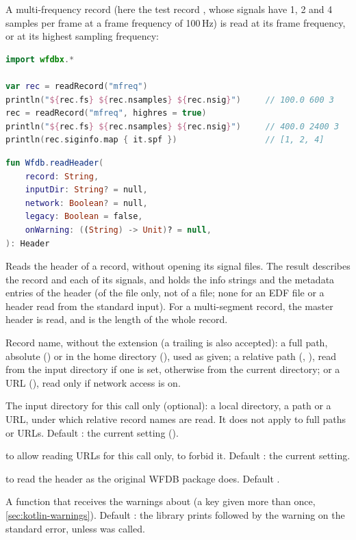 A multi-frequency record (here the test record , whose signals have 1, 2
and 4 samples per frame at a frame frequency of 100\,Hz) is read at its frame frequency,
or at its highest sampling frequency:
\begin{lstlisting}[language=Kotlin,style=example]
import wfdbx.*

var rec = readRecord("mfreq")
println("${rec.fs} ${rec.nsamples} ${rec.nsig}")     // 100.0 600 3
rec = readRecord("mfreq", highres = true)
println("${rec.fs} ${rec.nsamples} ${rec.nsig}")     // 400.0 2400 3
println(rec.siginfo.map { it.spf })                  // [1, 2, 4]
\end{lstlisting}

\begin{lstlisting}[language=Kotlin,style=signature]
fun Wfdb.readHeader(
    record: String,
    inputDir: String? = null,
    network: Boolean? = null,
    legacy: Boolean = false,
    onWarning: ((String) -> Unit)? = null,
): Header
\end{lstlisting}
Reads the header of a record, without opening its signal files. The result describes the
record and each of its signals, and holds the info strings and the metadata entries of the
header (of the  file only, not of a  file; none for an EDF file or a
header read from the standard input). For a multi-segment record, the master header is
read, and  is the length of the whole record.
\begin{params}
\item[record] Record name, without the  extension (a trailing  is
  also accepted): a full path, absolute () or in the home
  directory (), used as given; a relative path
  (, ), read from the input directory if one is set,
  otherwise from the current directory; or a URL
  (), read only if network access is
  on.
\item[inputDir] The input directory for this call only (optional): a local directory, a
  \code{\textasciitilde} path or a URL, under which relative record names are read. It
  does not apply to full paths or URLs. Default : the current setting
  ().
\item[network]  to allow reading URLs for this call only,  to
  forbid it. Default : the current setting.
\item[legacy]  to read the header as the original WFDB package does. Default
  .
\item[onWarning] A function that receives the warnings about  (a
  key given more than once, \cref{sec:kotlin-warnings}). Default : the library
  prints  followed by the warning on the standard error, unless
   was called.
\end{params}
